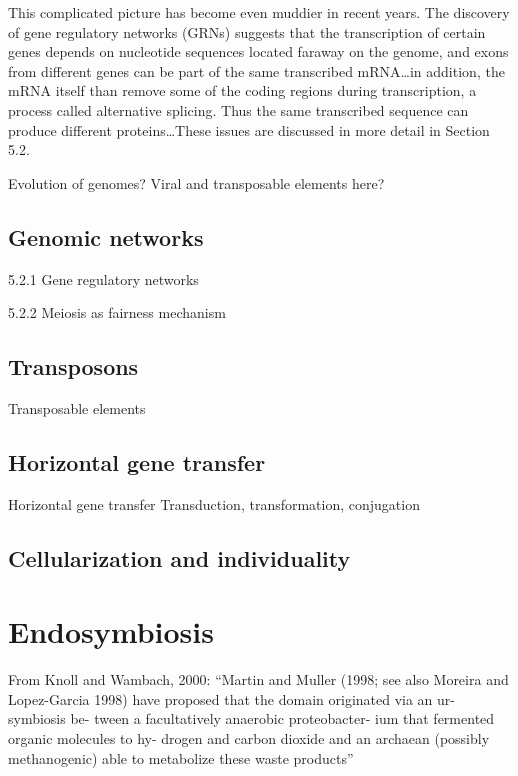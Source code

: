 \documentclass{tufte-book} %
\begin{document}
This complicated picture has become even muddier in recent years. The discovery of gene regulatory networks (GRNs) suggests that the transcription of certain genes depends on nucleotide sequences located faraway on the genome, and exons from different genes can be part of the same transcribed mRNA…in addition, the mRNA itself than remove some of the coding regions during transcription, a process called alternative splicing. Thus the same transcribed sequence can produce different proteins…These issues are discussed in more detail in Section 5.2.


Evolution of genomes? Viral and transposable elements here?


\section{Genomic networks}\label{gene-net}

	5.2.1	Gene regulatory networks

	5.2.2	Meiosis as fairness mechanism

\section{Transposons}\label{transposons}

Transposable elements

\section{Horizontal gene transfer}
Horizontal gene transfer
    Transduction, transformation, conjugation
    
\section{Cellularization and individuality}





\chapter{Endosymbiosis}\label{ch:endosymbiosis}

From Knoll and Wambach, 2000: “Martin and Muller (1998; see also Moreira and Lopez-Garcia 1998) have proposed that the domain originated via an ur-symbiosis be- tween a facultatively anaerobic proteobacter- ium that fermented organic molecules to hy- drogen and carbon dioxide and an archaean (possibly methanogenic) able to metabolize these waste products”
\end{document}

